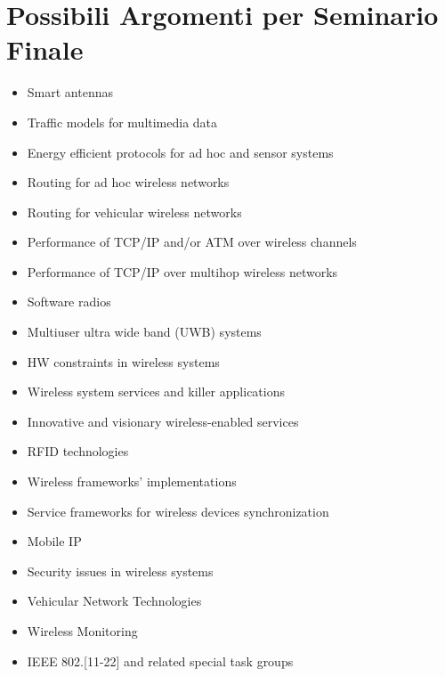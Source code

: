 \section*{Possibili Argomenti per Seminario Finale}
\begin{itemize}
    \item Smart antennas
    \item Traffic models for multimedia data
    \item Energy efficient protocols for ad hoc and sensor systems
    \item Routing for ad hoc wireless networks
    \item Routing for vehicular wireless networks
    \item Performance of TCP/IP and/or ATM over wireless channels
    \item Performance of TCP/IP over multihop wireless networks
    \item Software radios
    \item Multiuser ultra wide band (UWB) systems
    \item HW constraints in wireless systems
    \item Wireless system services and killer applications
    \item Innovative and visionary wireless-enabled services
    \item RFID technologies
    \item Wireless frameworks' implementations
    \item Service frameworks for wireless devices synchronization
    \item Mobile IP
    \item Security issues in wireless systems
    \item Vehicular Network Technologies
    \item Wireless Monitoring
    \item IEEE 802.[11-22] and related special task groups
\end{itemize}

